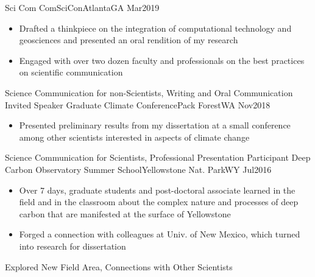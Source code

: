 %
%
%


\begin{experiences}
\experience
    {Sci Com}       {ComSciCon}{Atlanta}{GA}
    {Mar2019}      {
                      \begin{itemize}
                        \item Drafted a thinkpiece on the integration of computational technology and geosciences and presented an oral rendition of my research
                        \item Engaged with over two dozen faculty and professionals on the best practices on scientific communication
                      \end{itemize}
                    }
                    {Science Communication for non-Scientists, Writing and Oral Communication}
  \emptySeparator
\experience
    {Invited Speaker}       {Graduate Climate Conference}{Pack Forest}{WA}
    {Nov2018}      {
                      \begin{itemize}
                        \item Presented preliminary results from my dissertation at a small conference among other scientists interested in aspects of climate change
                      \end{itemize}
                    }
                    {Science Communication for Scientists, Professional Presentation}
  \emptySeparator  
 \experience
    {Participant}       {Deep Carbon Observatory Summer School}{Yellowstone Nat. Park}{WY}
    {Jul2016}      {
                      \begin{itemize}
                        \item Over 7 days, graduate students and post-doctoral associate learned in the field and in the classroom about the complex nature and processes of deep carbon that are manifested at the surface of Yellowstone
                        \item Forged a connection with colleagues at Univ. of New Mexico, which turned into research for dissertation
                      \end{itemize}
                    }
                    {Explored New Field Area, Connections with Other Scientists}
  \emptySeparator  

\end{experiences}
